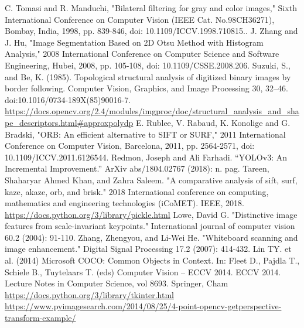 \documentclass[conference]{IEEEtran}
\begin{document}
\begin{thebibliography}{00}
 C. Tomasi and R. Manduchi, "Bilateral filtering for gray and color images," Sixth International Conference on Computer Vision (IEEE Cat. No.98CH36271), Bombay, India, 1998, pp. 839-846, doi: 10.1109/ICCV.1998.710815..
 J. Zhang and J. Hu, "Image Segmentation Based on 2D Otsu Method with Histogram Analysis," 2008 International Conference on Computer Science and Software Engineering, Hubei, 2008, pp. 105-108, doi: 10.1109/CSSE.2008.206.
Suzuki, S., and Be, K. (1985). Topological structural analysis of digitized binary images by border following. Computer Vision, Graphics, and Image Processing 30, 32–46. doi:10.1016/0734-189X(85)90016-7.
 \url{https://docs.opencv.org/2.4/modules/imgproc/doc/structural_analysis_and_shape_descriptors.html#approxpolydp}
 E. Rublee, V. Rabaud, K. Konolige and G. Bradski, "ORB: An efficient alternative to SIFT or SURF," 2011 International Conference on Computer Vision, Barcelona, 2011, pp. 2564-2571, doi: 10.1109/ICCV.2011.6126544.
Redmon, Joseph and Ali Farhadi. “YOLOv3: An Incremental Improvement.” ArXiv abs/1804.02767 (2018): n. pag.
Tareen, Shaharyar Ahmed Khan, and Zahra Saleem. "A comparative analysis of sift, surf, kaze, akaze, orb, and brisk." 2018 International conference on computing, mathematics and engineering technologies (iCoMET). IEEE, 2018.
 \url{https://docs.python.org/3/library/pickle.html}
 Lowe, David G. "Distinctive image features from scale-invariant keypoints." International journal of computer vision 60.2 (2004): 91-110.
Zhang, Zhengyou, and Li-Wei He. "Whiteboard scanning and image enhancement." Digital Signal Processing 17.2 (2007): 414-432.
Lin TY. et al. (2014) Microsoft COCO: Common Objects in Context. In: Fleet D., Pajdla T., Schiele B., Tuytelaars T. (eds) Computer Vision – ECCV 2014. ECCV 2014. Lecture Notes in Computer Science, vol 8693. Springer, Cham
 \url{https://docs.python.org/3/library/tkinter.html}
 \url{https://www.pyimagesearch.com/2014/08/25/4-point-opencv-getperspective-transform-example/}

\end{thebibliography}
\end{document}
